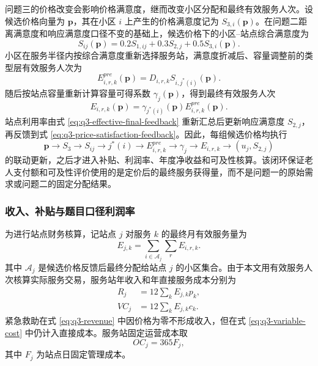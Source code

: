 问题三的价格改变会影响价格满意度，继而改变小区分配和最终有效服务人次。设候选价格向量为 $\boldsymbol p$，其在小区 $i$ 上产生的价格满意度记为 $S_{3,i}(\boldsymbol p)$。在问题二距离满意度和响应满意度口径不变的基础上，候选价格下的小区--站点综合满意度为
\begin{equation}
  S_{ij}(\boldsymbol p)
  =
  0.2S_{1,ij}
  +0.3S_{2,j}
  +0.5S_{3,i}(\boldsymbol p).
  \label{eq:q3-price-satisfaction-feedback}
\end{equation}
小区在服务半径内按综合满意度重新选择服务站，满意度折减后、容量调整前的类型层有效服务人次为
\begin{equation}
  E_{i,r,k}^{pre}(\boldsymbol p)
  =
  D_{i,r,k}S_{i,j^*(i)}(\boldsymbol p).
  \label{eq:q3-effective-pre-feedback}
\end{equation}
随后按站点容量重新计算容量可得系数 $\gamma_j(\boldsymbol p)$，得到最终有效服务人次
\begin{equation}
  E_{i,r,k}(\boldsymbol p)
  =
  \gamma_{j^*(i)}(\boldsymbol p)
  E_{i,r,k}^{pre}(\boldsymbol p).
  \label{eq:q3-effective-final-feedback}
\end{equation}
站点利用率由式 \eqref{eq:q3-effective-final-feedback} 重新汇总后更新响应满意度 $S_{2,j}$，再反馈到式 \eqref{eq:q3-price-satisfaction-feedback}。因此，每组候选价格均执行
\begin{equation}
  \boldsymbol p
  \rightarrow
  S_3
  \rightarrow
  S_{ij}
  \rightarrow
  j^*(i)
  \rightarrow
  E_{i,r,k}^{pre}
  \rightarrow
  \gamma_j
  \rightarrow
  E_{i,r,k}
  \rightarrow
  (u_j,S_{2,j})
  \label{eq:q3-feedback-chain}
\end{equation}
的联动更新，之后才进入补贴、利润率、年度净收益和可及性核算。该闭环保证老人支付额和可及性评价使用的是定价后的最终服务获得量，而不是问题一的原始需求或问题二的固定分配结果。

\subsubsection{收入、补贴与题目口径利润率}

为进行站点财务核算，记站点 $j$ 对服务 $k$ 的最终月有效服务量为
\begin{equation}
  E_{j,k}=\sum_{i\in\mathcal{A}_j}\sum_rE_{i,r,k}.
  \label{eq:q3-station-effective-service}
\end{equation}
其中 $\mathcal{A}_j$ 是候选价格反馈后最终分配给站点 $j$ 的小区集合。由于本文用有效服务人次核算实际服务交易，服务站年收入和年直接服务成本分别为
\begin{align}
  R_j&=12\sum_kE_{j,k}p_k, \label{eq:q3-revenue}\\
  VC_j&=12\sum_kE_{j,k}c_k. \label{eq:q3-variable-cost}
\end{align}
紧急救助在式 \eqref{eq:q3-revenue} 中因价格为零不形成收入，但在式 \eqref{eq:q3-variable-cost} 中仍计入直接成本。服务站固定运营成本取
\begin{equation}
  OC_j=365F_j,
  \label{eq:q3-operating-cost}
\end{equation}
其中 $F_j$ 为站点日固定管理成本。

